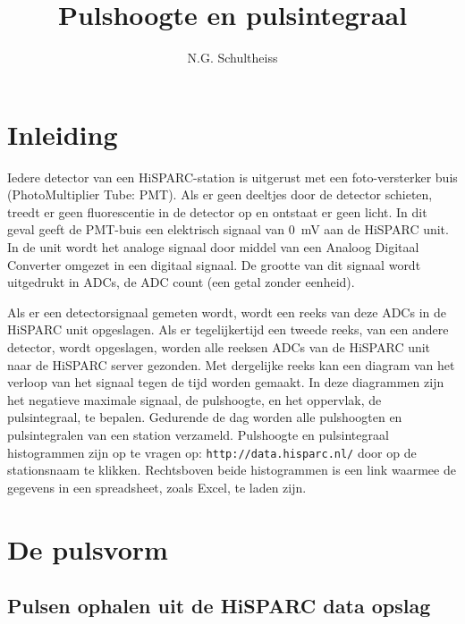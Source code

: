 



\title{Pulshoogte en pulsintegraal}
\author{N.G. Schultheiss}
\date{}

\maketitle

\section{Inleiding}

Iedere detector van een HiSPARC-station is uitgerust met een foto-versterker
buis (PhotoMultiplier Tube: PMT). Als er geen deeltjes door de detector
schieten, treedt er geen fluorescentie in de detector op en ontstaat
er geen licht. In dit geval geeft de PMT-buis een elektrisch signaal
van \SI{0}{\milli\volt} aan de HiSPARC unit. In de unit wordt het
analoge signaal door middel van een Analoog Digitaal Converter omgezet
in een digitaal signaal. De grootte van dit signaal wordt uitgedrukt
in ADCs, de ADC count (een getal zonder eenheid).

Als er een detectorsignaal gemeten wordt, wordt een reeks van deze
ADCs in de HiSPARC unit opgeslagen. Als er tegelijkertijd een tweede
reeks, van een andere detector, wordt opgeslagen, worden alle reeksen
ADCs van de HiSPARC unit naar de HiSPARC server gezonden. Met dergelijke
reeks kan een diagram van het verloop van het signaal tegen de tijd
worden gemaakt. In deze diagrammen zijn het negatieve maximale signaal,
de pulshoogte, en het oppervlak, de pulsintegraal, te bepalen. Gedurende
de dag worden alle pulshoogten en pulsintegralen van een station verzameld.
Pulshoogte en pulsintegraal histogrammen zijn op te vragen op: \texttt{\small http://data.hisparc.nl/}
door op de stationsnaam te klikken. Rechtsboven beide histogrammen
is een link waarmee de gegevens in een spreadsheet, zoals Excel,
te laden zijn. 


\section{De pulsvorm}


\subsection{Pulsen ophalen uit de HiSPARC data opslag}

